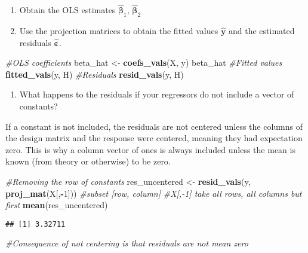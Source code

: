 \documentclass[]{book}
\newenvironment{Shaded}{\begin{snugshade}}{\end{snugshade}}
\newcommand{\CommentTok}[1]{\textcolor[rgb]{0.56,0.35,0.01}{\textit{#1}}}
\newcommand{\DecValTok}[1]{\textcolor[rgb]{0.00,0.00,0.81}{#1}}
\newcommand{\KeywordTok}[1]{\textcolor[rgb]{0.13,0.29,0.53}{\textbf{#1}}}
\newcommand{\NormalTok}[1]{#1}
\newcommand{\OperatorTok}[1]{\textcolor[rgb]{0.81,0.36,0.00}{\textbf{#1}}}
\newcommand{\StringTok}[1]{\textcolor[rgb]{0.31,0.60,0.02}{#1}}
\providecommand{\tightlist}{%
  \setlength{\itemsep}{0pt}\setlength{\parskip}{0pt}}
\theoremstyle{definition}
\theoremstyle{definition}
\theoremstyle{definition}
\theoremstyle{remark}
\begin{document}
\begin{enumerate}
\def\labelenumi{\alph{enumi}.}
\setcounter{enumi}{1}
\tightlist
\item
  Obtain the OLS estimates \(\widehat{\boldsymbol{\beta}}_1\),
  \(\widehat{\boldsymbol{\beta}}_2\)
\item
  Use the projection matrices to obtain the fitted values
  \(\widehat{\boldsymbol{y}}\) and the estimated residuals
  \(\widehat{\boldsymbol{\varepsilon}}\).
\end{enumerate}

\begin{Shaded}
\begin{Highlighting}[]
\CommentTok{#OLS coefficients}
\NormalTok{beta_hat <-}\StringTok{ }\KeywordTok{coefs_vals}\NormalTok{(X, y)}
\NormalTok{beta_hat}
\CommentTok{#Fitted values}
\KeywordTok{fitted_vals}\NormalTok{(y, H)}
\CommentTok{#Residuals}
\KeywordTok{resid_vals}\NormalTok{(y, H)}
\end{Highlighting}
\end{Shaded}

\begin{enumerate}
\def\labelenumi{\alph{enumi}.}
\setcounter{enumi}{3}
\tightlist
\item
  What happens to the residuals if your regressors do not include a
  vector of constants?
\end{enumerate}

If a constant is not included, the residuals are not centered unless the
columns of the design matrix and the response were centered, meaning
they had expectation zero. This is why a column vector of ones is always
included unless the mean is known (from theory or otherwise) to be zero.

\begin{Shaded}
\begin{Highlighting}[]
\CommentTok{#Removing the row of constants}
\NormalTok{res_uncentered <-}\StringTok{ }\KeywordTok{resid_vals}\NormalTok{(y, }\KeywordTok{proj_mat}\NormalTok{(X[,}\OperatorTok{-}\DecValTok{1}\NormalTok{])) }\CommentTok{#subset [row, column]}
\CommentTok{#X[,-1] take all rows, all columns but first}
\KeywordTok{mean}\NormalTok{(res_uncentered)}
\end{Highlighting}
\end{Shaded}

\begin{verbatim}
## [1] 3.32711
\end{verbatim}

\begin{Shaded}
\begin{Highlighting}[]
\CommentTok{#Consequence of not centering is that residuals are not mean zero}
\end{Highlighting}
\end{Shaded}
\end{document}
